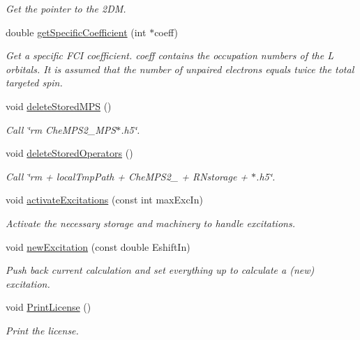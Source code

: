 \begin{DoxyCompactItemize}
\begin{DoxyCompactList}\small\item\em Get the pointer to the 2\-D\-M. \end{DoxyCompactList}\item 
double \hyperlink{classCheMPS2_1_1DMRG_aadcaff5f067d6625ac69237cee0ee92e}{get\-Specific\-Coefficient} (int $\ast$coeff)
\begin{DoxyCompactList}\small\item\em Get a specific F\-C\-I coefficient. coeff contains the occupation numbers of the L orbitals. It is assumed that the number of unpaired electrons equals twice the total targeted spin. \end{DoxyCompactList}\item 
\hypertarget{classCheMPS2_1_1DMRG_a0f4e487c40f522846288fe1b3d55e66c}{void \hyperlink{classCheMPS2_1_1DMRG_a0f4e487c40f522846288fe1b3d55e66c}{delete\-Stored\-M\-P\-S} ()}\label{classCheMPS2_1_1DMRG_a0f4e487c40f522846288fe1b3d55e66c}

\begin{DoxyCompactList}\small\item\em Call \char`\"{}rm Che\-M\-P\-S2\-\_\-\-M\-P\-S$\ast$.\-h5\char`\"{}. \end{DoxyCompactList}\item 
\hypertarget{classCheMPS2_1_1DMRG_a2254cc31b5d9497694ea2229226b7bd6}{void \hyperlink{classCheMPS2_1_1DMRG_a2254cc31b5d9497694ea2229226b7bd6}{delete\-Stored\-Operators} ()}\label{classCheMPS2_1_1DMRG_a2254cc31b5d9497694ea2229226b7bd6}

\begin{DoxyCompactList}\small\item\em Call \char`\"{}rm + local\-Tmp\-Path + Che\-M\-P\-S2\-\_\- + R\-Nstorage + $\ast$.\-h5\char`\"{}. \end{DoxyCompactList}\item 
void \hyperlink{classCheMPS2_1_1DMRG_ab442cbc43e2e5d877660859578849133}{activate\-Excitations} (const int max\-Exc\-In)
\begin{DoxyCompactList}\small\item\em Activate the necessary storage and machinery to handle excitations. \end{DoxyCompactList}\item 
void \hyperlink{classCheMPS2_1_1DMRG_acfb3123c72e3503f2d6c77dcf9eb141a}{new\-Excitation} (const double Eshift\-In)
\begin{DoxyCompactList}\small\item\em Push back current calculation and set everything up to calculate a (new) excitation. \end{DoxyCompactList}\item 
\hypertarget{classCheMPS2_1_1DMRG_a6c8741ce96ac0e806a8ddc6c3623d904}{void \hyperlink{classCheMPS2_1_1DMRG_a6c8741ce96ac0e806a8ddc6c3623d904}{Print\-License} ()}\label{classCheMPS2_1_1DMRG_a6c8741ce96ac0e806a8ddc6c3623d904}

\begin{DoxyCompactList}\small\item\em Print the license. \end{DoxyCompactList}\end{DoxyCompactItemize}


